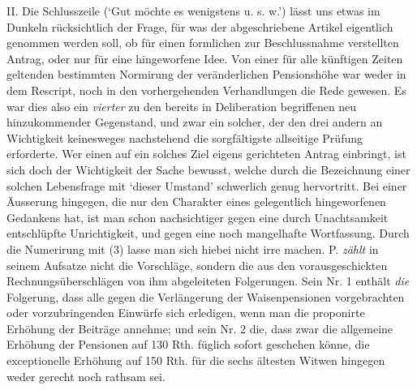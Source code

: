 II. Die Schlusszeile (‘Gut möchte es wenigstens u. s. w.’) lässt uns etwas im Dunkeln rücksichtlich der Frage, für was der abgeschriebene Artikel eigentlich genommen werden soll, ob für einen formlichen zur Beschlussnahme verstellten Antrag, oder nur für eine hingeworfene Idee. Von einer für alle künftigen Zeiten geltenden bestimmten Normirung der veränderlichen Pensionshöhe war weder in dem Rescript, noch in den vorhergehenden Verhandlungen die Rede gewesen. Es war dies also ein \textit{vierter} zu den bereits in Deliberation begriffenen neu hinzukommender Gegenstand, und zwar ein solcher, der den drei andern an Wichtigkeit keinesweges nachstehend die sorgfältigste allseitige Prüfung erforderte. Wer einen auf ein solches Ziel eigens gerichteten Antrag einbringt, ist sich doch der Wichtigkeit der Sache bewusst, welche durch die Bezeichnung einer solchen Lebensfrage mit ‘dieser Umstand’ schwerlich genug hervortritt. Bei einer Äusserung hingegen, die nur den Charakter eines gelegentlich hingeworfenen Gedankens hat, ist man schon nachsichtiger gegen eine durch Unachtsamkeit entschlüpfte Unrichtigkeit, und gegen eine noch mangelhafte Wortfassung. Durch die Numerirung mit (3) lasse man sich hiebei nicht irre machen. P. \textit{zählt} in seinem Aufsatze nicht die Vorschläge, sondern die aus den vorausgeschickten Rechnungsüberschlägen von ihm abgeleiteten Folgerungen. Sein Nr. 1 enthält \textit{die} Folgerung, dass alle gegen die Verlängerung der Waisenpensionen vorgebrachten oder vorzubringenden Einwürfe sich erledigen, wenn man die proponirte Erhöhung der Beiträge annehme; und sein Nr. 2 die, dass zwar die allgemeine Erhöhung der Pensionen auf 130 Rth. füglich sofort geschehen könne, die exceptionelle Erhöhung auf 150 Rth. für die sechs ältesten Witwen hingegen weder gerecht noch rathsam sei.
